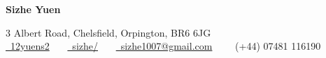 \documentclass{article}
\begin{document}
\pagestyle{empty} %


\par{\centering
		{\Large \textbf{Sizhe Yuen}
	}\par}

\begin{center}
3 Albert Road, Chelsfield, Orpington, BR6 6JG \\
\href{https://github.com/12yuens2}{\faGithub\ 12yuens2}
\ \ \ \href{https://www.linkedin.com/in/sizhe/}{\faLinkedin\ sizhe/}
\ \ \ \href{mailto:sizhe1007@gmail.com}{\faEnvelopeO\ sizhe1007@gmail.com}
\ \ \ \faMobile\ (+44) 07481 116190
\end{center}

\cvEducation
\cvWorkExperience
\cvPreviousProjects
\cvPublications
\cvPresentations
\cvSkills
\end{document}
